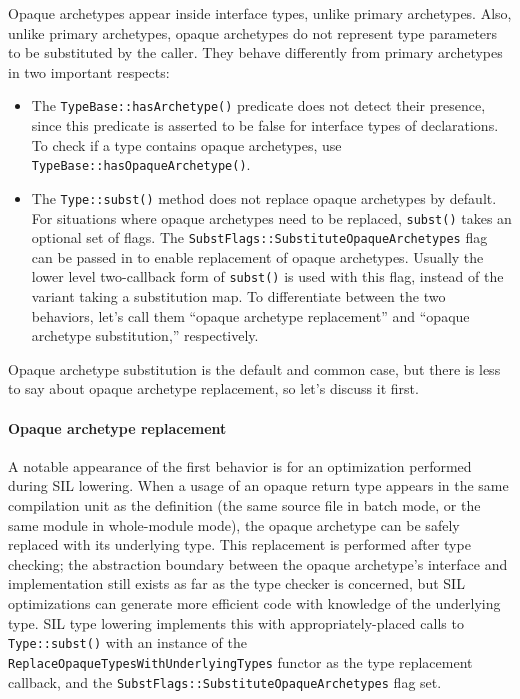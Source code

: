 \documentclass[a4paper,headsepline,bibliography=totoc,toc=flat,fleqn,twoside=semi]{scrbook}
\theoremstyle{definition}
\theoremstyle{definition}
\theoremstyle{definition}
\begin{document}
Opaque archetypes appear inside interface types, unlike primary archetypes. Also, unlike primary archetypes, opaque archetypes do not represent type parameters to be substituted by the caller. They behave differently from primary archetypes in two important respects:
\begin{itemize}
\item The \texttt{TypeBase::hasArchetype()} predicate does not detect their presence, since this predicate is asserted to be false for interface types of declarations. To check if a type contains opaque archetypes, use \texttt{TypeBase::hasOpaqueArchetype()}.

\item The \texttt{Type::subst()} method does not replace opaque archetypes by default. For situations where opaque archetypes need to be replaced, \texttt{subst()} takes an optional set of flags. The \texttt{SubstFlags::SubstituteOpaqueArchetypes} flag can be passed in to enable replacement of opaque archetypes. Usually the lower level two-callback form of \texttt{subst()} is used with this flag, instead of the variant taking a substitution map. To differentiate between the two behaviors, let's call them ``opaque archetype replacement'' and ``opaque archetype substitution,'' respectively.
\end{itemize}
Opaque archetype substitution is the default and common case, but there is less to say about opaque archetype replacement, so let's discuss it first.

\paragraph{Opaque archetype replacement} A notable appearance of the first behavior is for an optimization performed during SIL lowering. When a usage of an opaque return type appears in the same compilation unit as the definition (the same source file in batch mode, or the same module in whole-module mode), the opaque archetype can be safely replaced with its underlying type. This replacement is performed after type checking; the abstraction boundary between the opaque archetype's interface and implementation still exists as far as the type checker is concerned, but SIL optimizations can generate more efficient code with knowledge of the underlying type. SIL type lowering implements this with appropriately-placed calls to \texttt{Type::subst()} with an instance of the \texttt{ReplaceOpaqueTypesWithUnderlyingTypes} functor as the type replacement callback, and the \texttt{SubstFlags::SubstituteOpaqueArchetypes} flag set.
\end{document}
